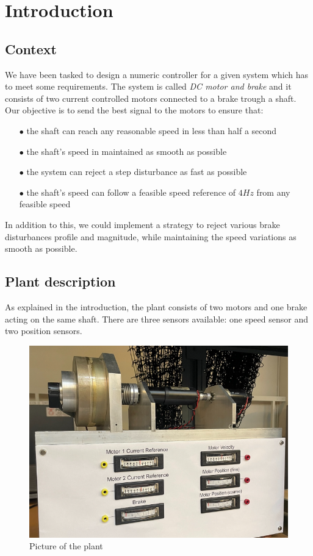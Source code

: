 \setcounter{secnumdepth}{-1}

\chapter{Introduction}

\section{Context}
\label{section:intro}

We have been tasked to design a numeric controller for a given system which has to meet some requirements. The system is 
called \textit{DC motor and brake} and it consists of two current controlled motors connected to a brake trough a shaft. \\

Our objective is to send the best signal to the motors to ensure that:

\begin{enumerate}
    \item[$\bullet$] the shaft can reach any reasonable speed in less than half a second
    \item[$\bullet$] the shaft's speed in maintained as smooth as possible
    \item[$\bullet$] the system can reject a step disturbance as fast as possible
    \item[$\bullet$] the shaft's speed can follow a feasible speed reference of $4 Hz$ from any feasible speed
\end{enumerate}

In addition to this, we could implement a strategy to reject various brake disturbances profile and magnitude, while 
maintaining the speed variations as smooth as possible.

\section{Plant description}

As explained in the introduction, the plant consists of two motors and one brake acting on the same shaft. There are 
three sensors available: one speed sensor and two position sensors.

\begin{figure}[H]
    \centering
    \includegraphics[height=\textheight/5]{Pictures/plant_picture.png}
    \caption{Picture of the plant}
\end{figure}


